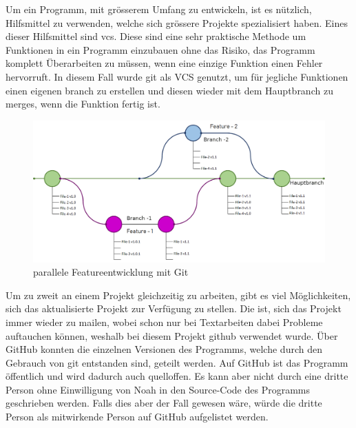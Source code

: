 \documentclass[a4paper,11pt]{article}
\begin{document}
Um ein Programm, mit grösserem Umfang zu entwickeln, ist es nützlich, Hilfsmittel zu verwenden, welche sich grössere Projekte spezialisiert haben. 
Eines dieser Hilfsmittel sind \gls{vcs}. Diese sind eine sehr praktische Methode um Funktionen in ein Programm einzubauen ohne das Risiko,
das Programm komplett Überarbeiten zu müssen, wenn eine einzige Funktion einen Fehler hervorruft. In diesem Fall wurde \Gls{git} als VCS genutzt, um für jegliche Funktionen
einen eigenen \Gls{branch} zu erstellen und diesen wieder mit dem Hauptbranch zu \glspl{merge}, wenn die Funktion fertig ist.\cite{git} \cite{github} \\

\begin{figure}[H]
    \centering
    \includegraphics[width=.8\textwidth]{media/gitflow2.png}
    \caption{parallele Featureentwicklung mit Git \cite{gitflowBlog}}
\end{figure}

Um zu zweit an einem Projekt gleichzeitig zu arbeiten, gibt es viel Möglichkeiten, sich das aktualisierte Projekt zur Verfügung zu stellen. Die  ist, sich das 
Projekt immer wieder zu mailen, wobei schon nur bei Textarbeiten dabei Probleme auftauchen können, weshalb bei diesem Projekt \Gls{github} 
verwendet wurde. Über GitHub konnten die einzelnen Versionen des Programms, welche durch den Gebrauch von \gls{git} entstanden sind, geteilt werden. 
Auf GitHub ist das Programm öffentlich und wird dadurch auch quelloffen. Es kann aber nicht durch eine dritte Person ohne Einwilligung von Noah in den Source-Code
des Programms geschrieben werden. Falls dies aber der Fall gewesen wäre, würde die dritte Person als mitwirkende Person auf GitHub aufgelistet werden. \cite{github} \\
\end{document}

